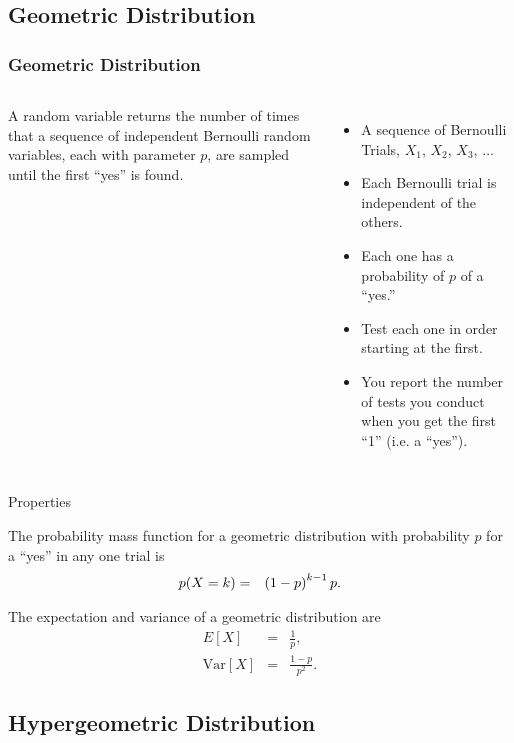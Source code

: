 \subsection{Geometric Distribution}

\begin{frame}
  \frametitle{Geometric Distribution}

  \begin{columns}
    \begin{definition}
      A  random variable returns the number of
      times that a sequence of independent Bernoulli random variables,
      each with parameter $p$, are sampled until the first ``yes''
      is found.
    \end{definition}
      \begin{itemize}
      \item A sequence of Bernoulli Trials, $X_1$, $X_2$, $X_3$,
        $\ldots$
      \item Each Bernoulli trial is independent of the others.
      \item Each one has a probability of $p$ of a ``yes.''
      \item Test each one in order starting at the first.
      \item You report the number of tests you conduct when you get
        the first ``1'' (i.e. a ``yes'').
      \end{itemize}
  \end{columns}

\end{frame}

\begin{frame}{Properties}

  The probability mass function for a geometric distribution with
  probability $p$ for a ``yes'' in any one trial is
  \begin{eqnarray*}
    p(X=k) & = & \left( 1-p\right)^{k-1} p.
  \end{eqnarray*}

  The expectation and variance of a geometric distribution are
  \begin{eqnarray*}
    E[X] & = & \frac{1}{p}, \\
    \mathrm{Var}[X] & = & \frac{1-p}{p^2}.
  \end{eqnarray*}

\end{frame}

\subsection{Hypergeometric Distribution}

